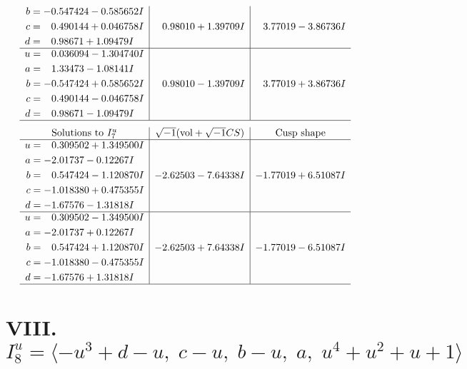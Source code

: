\documentclass[1p]{elsarticle_modified}
\theoremstyle{definition}
\newcommand{\I}{\sqrt{-1}}
\begin{document}
$$\begin{array}{c|c|c}
\begin{aligned}
b &= -0.547424 - 0.585652 I \\
c &= \phantom{-}0.490144 + 0.046758 I \\
d &= \phantom{-}0.98671 + 1.09479 I\end{aligned}
 & \phantom{-}0.98010 + 1.39709 I & \phantom{-}3.77019 - 3.86736 I \\ \hline\begin{aligned}
u &= \phantom{-}0.036094 - 1.304740 I \\
a &= \phantom{-}1.33473 - 1.08141 I \\
b &= -0.547424 + 0.585652 I \\
c &= \phantom{-}0.490144 - 0.046758 I \\
d &= \phantom{-}0.98671 - 1.09479 I\end{aligned}
 & \phantom{-}0.98010 - 1.39709 I & \phantom{-}3.77019 + 3.86736 I\\
 \hline 
 \end{array}$$\newpage$$\begin{array}{c|c|c}  
\text{Solutions to }I^u_{7}& \I (\text{vol} + \sqrt{-1}CS) & \text{Cusp shape}\\
 \hline 
\begin{aligned}
u &= \phantom{-}0.309502 + 1.349500 I \\
a &= -2.01737 - 0.12267 I \\
b &= \phantom{-}0.547424 - 1.120870 I \\
c &= -1.018380 + 0.475355 I \\
d &= -1.67576 - 1.31818 I\end{aligned}
 & -2.62503 - 7.64338 I & -1.77019 + 6.51087 I \\ \hline\begin{aligned}
u &= \phantom{-}0.309502 - 1.349500 I \\
a &= -2.01737 + 0.12267 I \\
b &= \phantom{-}0.547424 + 1.120870 I \\
c &= -1.018380 - 0.475355 I \\
d &= -1.67576 + 1.31818 I\end{aligned}
 & -2.62503 + 7.64338 I & -1.77019 - 6.51087 I\\
 \hline 
 \end{array}$$\newpage\newpage\renewcommand{\arraystretch}{1}
\centering \section*{VIII. $I^u_{8}= \langle - u^3+d- u,\;c- u,\;b- u,\;a,\;u^4+u^2+u+1 \rangle$}
\end{document}
